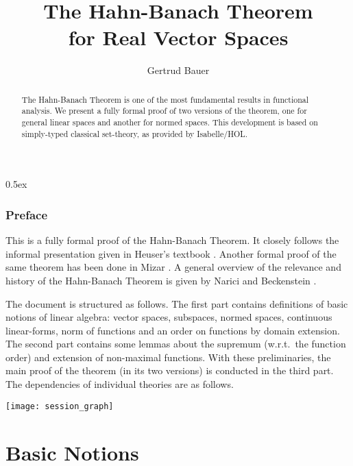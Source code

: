 \documentclass[10pt,a4paper,twoside]{article}
\begin{document}
\pagestyle{headings}

\title{The Hahn-Banach Theorem \\ for Real Vector Spaces}
\author{Gertrud Bauer}
\maketitle

\begin{abstract}
  The Hahn-Banach Theorem is one of the most fundamental results in functional
  analysis. We present a fully formal proof of two versions of the theorem,
  one for general linear spaces and another for normed spaces.  This
  development is based on simply-typed classical set-theory, as provided by
  Isabelle/HOL.
\end{abstract}


\tableofcontents
\parindent 0pt \parskip 0.5ex

\clearpage
\section{Preface}

This is a fully formal proof of the Hahn-Banach Theorem. It closely follows
the informal presentation given in Heuser's textbook \cite[{\S} 36]{Heuser:1986}.
Another formal proof of the same theorem has been done in Mizar
\cite{Nowak:1993}.  A general overview of the relevance and history of the
Hahn-Banach Theorem is given by Narici and Beckenstein \cite{Narici:1996}.

\medskip The document is structured as follows.  The first part contains
definitions of basic notions of linear algebra: vector spaces, subspaces,
normed spaces, continuous linear-forms, norm of functions and an order on
functions by domain extension.  The second part contains some lemmas about the
supremum (w.r.t.\ the function order) and extension of non-maximal functions.
With these preliminaries, the main proof of the theorem (in its two versions)
is conducted in the third part.  The dependencies of individual theories are
as follows.

\begin{center}
  \texttt{[image: session\_graph]}  
\end{center}

\clearpage
\part {Basic Notions}
\end{document}
